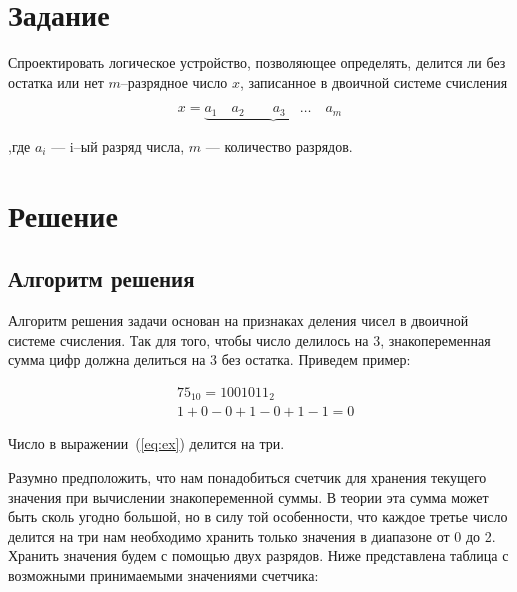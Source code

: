 \documentclass[utf8x, 12pt]{G7-32}
\begin{document}
\frontmatter 

\thispagestyle{empty}
\setcounter{page}{0}
\tableofcontents
\clearpage
\mainmatter



\chapter{Задание}

Спроектировать логическое устройство, позволяющее определять, делится ли без остатка или нет $m$--разрядное число $x$, записанное в двоичной системе счисления

\begin{equation}
x = \underbrace{a_1 \quad a_2 \quad \quad a_3 \quad \dots \quad a_m}
\end{equation}
\bigskip


 ,где  $a_i$ --- i--ый разряд числа, $m$ --- количество разрядов.




\chapter{Решение}

\section{Алгоритм решения}

Алгоритм решения задачи основан на признаках деления чисел в двоичной системе счисления. Так для того, чтобы число делилось на 3, знакопеременная сумма цифр должна делиться на 3 без остатка. Приведем пример:

\begin{equation} \label{eq:ex}
\begin{split}
&75_{10} = 1001011_2{}\\
&1+0-0+1-0+1-1=0
\end{split}
\end{equation}

Число в выражении~(\ref{eq:ex}) делится на три. 
\bigskip

Разумно предположить, что нам понадобиться счетчик для хранения текущего значения при вычислении знакопеременной суммы. В теории эта сумма может быть сколь угодно большой, но в силу той особенности, что каждое третье число делится на три нам необходимо хранить только значения в диапазоне от 0 до 2. Хранить значения будем с помощью двух разрядов. Ниже представлена таблица с возможными принимаемыми значениями счетчика:
\end{document}
